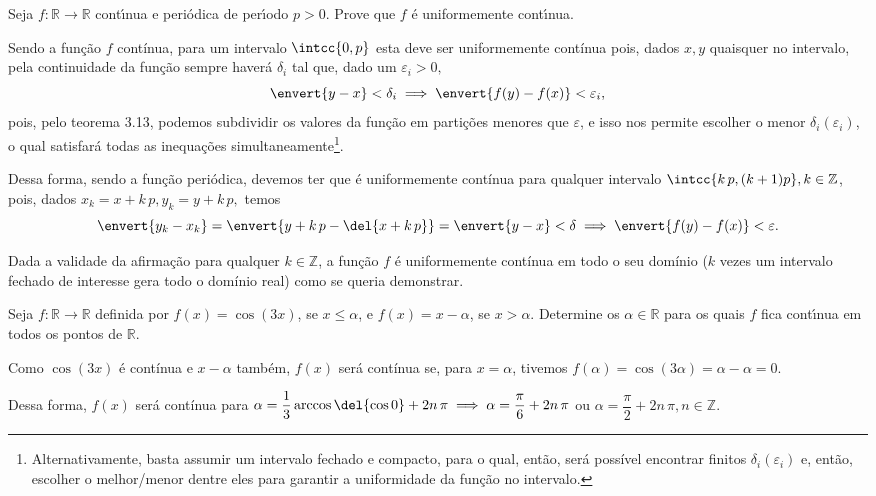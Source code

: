 \documentclass{IMTexam}
\begin{document}
\begin{questions}
		
		Seja $ f : \mathbb{R} \to \mathbb{R} $ contı́nua e periódica de perı́odo $ p > 0 $. Prove que $ f $ é uniformemente contı́nua.
		
		\begin{solution}
			Sendo a função $ f $ contínua, para um intervalo $ \intcc{0,p} $ esta deve ser uniformemente contínua pois, dados $ x,y $ quaisquer no intervalo, pela continuidade da função sempre haverá $ \delta_i $ tal que, dado um $ \varepsilon_i>0, $
			\[ \envert{y-x}<\delta_i\implies\envert{f(y)-f(x)}<\varepsilon_i, \]
			pois, pelo teorema 3.13, podemos subdividir os valores da função em partições menores que $ \varepsilon $, e isso nos permite escolher o menor $ \delta_i(\varepsilon_i) $, o qual satisfará todas as inequações simultaneamente\footnote{Alternativamente, basta assumir um intervalo fechado e compacto, para o qual, então, será possível encontrar finitos $ \delta_i(\varepsilon_i) $ e, então, escolher o melhor/menor dentre eles para garantir a uniformidade da função no intervalo.}.
			
			Dessa forma, sendo a função periódica, devemos ter que é uniformemente contínua para qualquer intervalo $ \intcc{k\,p,(k+1)p},k\in\mathbb{Z} $, pois, dados $ x_k=x+k\,p,y_k=y+k\,p, $ temos
			\[ \envert{y_{k}-x_k}=\envert{y+k\,p-\del{x+k\,p}}=\envert{y-x}<\delta\implies\envert{f(y)-f(x)}<\varepsilon. \]
			
			Dada a validade da afirmação para qualquer $ k\in\mathbb{Z} $, a função $ f $ é uniformemente contínua em todo o seu domínio ($ k $ vezes um intervalo fechado de interesse gera todo o domínio real) como se queria demonstrar.
		\end{solution}
		
		
		Seja $ f : \mathbb{R} \to \mathbb{R} $ definida por $ f(x) = \cos(3x) $,
		se $ x \leqslant \alpha $, e $ f(x) = x − \alpha $, se $ x > \alpha $. Determine os $ \alpha\in\mathbb{R} $ para os quais $ f $ fica contı́nua em todos os pontos de $ \mathbb{R} $.
		
		\begin{solution}
			Como $ \cos(3x) $ é contínua e $ x-\alpha $ também, $ f(x) $ será contínua se, para $ x=\alpha $, tivemos $ f(\alpha)=\cos(3\alpha)=\alpha-\alpha=0 $.
			
			Dessa forma, $ f(x) $ será contínua para $ \alpha=\dfrac{1}{3}\arccos\del{\cos0}+2n\,\pi\implies \alpha=\dfrac{\pi}{6}+2n\,\pi$ ou $\alpha=\dfrac{\pi}{2}+2n\,\pi,n\in\mathbb{Z} $.
		\end{solution}
		

\end{questions}
\end{document}
